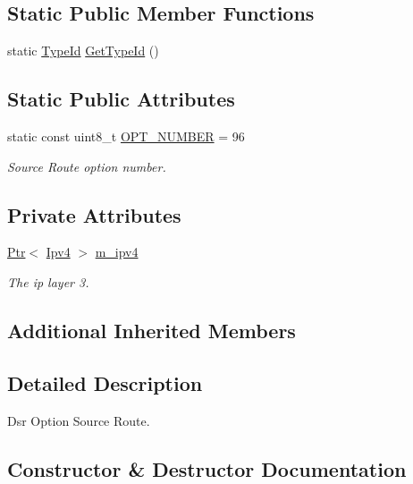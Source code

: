 \subsection*{Static Public Member Functions}
\begin{DoxyCompactItemize}
\item 
static \hyperlink{classns3_1_1TypeId}{Type\+Id} \hyperlink{classns3_1_1dsr_1_1DsrOptionSR_abb6468d7c086f79537a9e1c6a52555ee}{Get\+Type\+Id} ()
\end{DoxyCompactItemize}
\subsection*{Static Public Attributes}
\begin{DoxyCompactItemize}
\item 
static const uint8\+\_\+t \hyperlink{classns3_1_1dsr_1_1DsrOptionSR_a6da9ac0656903ab8ecd89c7e147479b2}{O\+P\+T\+\_\+\+N\+U\+M\+B\+ER} = 96
\begin{DoxyCompactList}\small\item\em Source Route option number. \end{DoxyCompactList}\end{DoxyCompactItemize}
\subsection*{Private Attributes}
\begin{DoxyCompactItemize}
\item 
\hyperlink{classns3_1_1Ptr}{Ptr}$<$ \hyperlink{classns3_1_1Ipv4}{Ipv4} $>$ \hyperlink{classns3_1_1dsr_1_1DsrOptionSR_a6f9e883b6d334eec90f76d3206ff3e16}{m\+\_\+ipv4}
\begin{DoxyCompactList}\small\item\em The ip layer 3. \end{DoxyCompactList}\end{DoxyCompactItemize}
\subsection*{Additional Inherited Members}


\subsection{Detailed Description}
Dsr Option Source Route. 

\subsection{Constructor \& Destructor Documentation}
